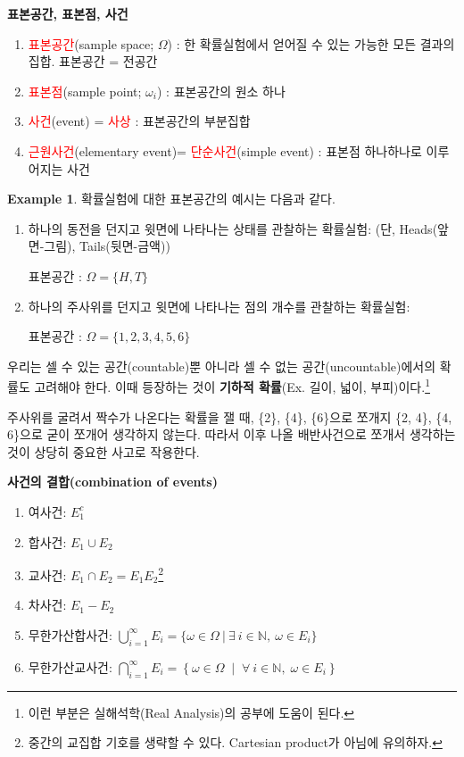 \documentclass{article}
\theoremstyle{definition}
\newtheorem{example}[theorem]{Example}
\begin{document}
\noindent
\textbf{표본공간, 표본점, 사건}

\begin{enumerate}
    \item \textcolor{red}{표본공간}(sample space; $\Omega$) : 한 확률실험에서 얻어질 수 있는 가능한 모든 결과의 집합. 표본공간 = 전공간
    \item \textcolor{red}{표본점}(sample point; $\omega_i$) : 표본공간의 원소 하나
    \item \textcolor{red}{사건}(event) = \textcolor{red}{사상} : 표본공간의 부분집합
    \item \textcolor{red}{근원사건}(elementary event)= \textcolor{red}{단순사건}(simple event) : 표본점 하나하나로 이루어지는 사건
\end{enumerate}

\begin{example}
    확률실험에 대한 표본공간의 예시는 다음과 같다.

    \begin{enumerate}
        \item 하나의 동전을 던지고 윗면에 나타나는 상태를 관찰하는 확률실험: (단, Heads(앞면-그림), Tails(뒷면-금액))
        
        표본공간 : $\Omega = \{ H, T \}$

        \item 하나의 주사위를 던지고 윗면에 나타나는 점의 개수를 관찰하는 확률실험:
        
        표본공간 : $\Omega = \{1,2,3,4,5,6 \}$
    \end{enumerate}
\end{example}

\noindent
우리는 셀 수 있는 공간(countable)뿐 아니라 셀 수 없는 공간(uncountable)에서의 확률도 고려해야 한다. 이때 등장하는 것이 \textbf{기하적 확률}(Ex. 길이, 넓이, 부피)이다.\footnote{이런 부분은 실해석학(Real Analysis)의 공부에 도움이 된다.}

\vspace{4mm}\noindent
주사위를 굴려서 짝수가 나온다는 확률을 잴 때, \{2\}, \{4\}, \{6\}으로 쪼개지 \{2, 4\}, \{4, 6\}으로 굳이 쪼개어 생각하지 않는다. 따라서 이후 나올 배반사건으로 쪼개서 생각하는 것이 상당히 중요한 사고로 작용한다.

\newpage

\noindent
\textbf{사건의 결합(combination of events)}

\begin{enumerate}
    \item 여사건: $E_1^c$
    \item 합사건: $E_1 \cup E_2$
    \item 교사건: $E_1 \cap E_2 = E_1 E_2$\footnote{중간의 교집합 기호를 생략할 수 있다. Cartesian product가 아님에 유의하자.}
    \item 차사건: $E_1 - E_2$
    \item 무한가산합사건: $\bigcup_{i=1}^\infty E_i = \{ \omega \in \Omega \ | \ \exists \ i \in \mathbb{N}, \ \omega \in E_i \}$
    \item 무한가산교사건: $\bigcap_{i=1}^{\infty} E_i = \left\{ \omega \in \Omega \;\middle|\; \forall \ i \in \mathbb{N},\; \omega \in E_i \right\} $
\end{enumerate}
\end{document}

